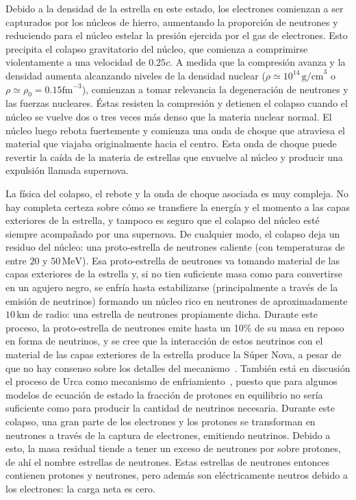 Debido a la densidad de la estrella en este estado, los electrones comienzan a ser capturados por los núcleos de hierro, aumentando la proporción de neutrones y reduciendo para el núcleo estelar la presión ejercida por el gas de electrones.
Esto precipita el colapso gravitatorio del núcleo, que comienza a comprimirse violentamente a una velocidad de $0.25c$.
A medida que la compresión avanza y la densidad aumenta alcanzando niveles de la densidad nuclear ($\rho \simeq 10^{14}\,\text{g/cm}^3$ o $ \rho \simeq \rho_0=0.15 \text{fm}^{-3}$), comienzan a tomar relevancia la degeneración de neutrones y las fuerzas nucleares.
Éstas resisten la compresión y detienen el colapso cuando el núcleo se vuelve dos o tres veces más denso que la materia nuclear normal.
El núcleo luego rebota fuertemente y comienza una onda de choque que atraviesa el material que viajaba originalmente hacia el centro.
Esta onda de choque puede revertir la caída de la materia de estrellas que envuelve al núcleo y producir una expulsión llamada supernova.

La física del colapso, el rebote y la onda de choque asociada es muy compleja.
No hay completa certeza sobre cómo se transfiere la energía y el momento a las capas exteriores de la estrella, y tampoco es seguro que el colapso del núcleo esté siempre acompañado por una supernova.
De cualquier modo, el colapso deja un residuo del núcleo: una proto-estrella de neutrones caliente (con temperaturas de entre $20$ y $50\,\text{MeV}$).
Esa proto-estrella de neutrones va tomando material de las capas exteriores de la estrella y, si no tien suficiente masa como para convertirse en un agujero negro, se enfría hasta estabilizarse (principalmente a través de la emisión de neutrinos) formando un núcleo rico en neutrones de aproximadamente $10\,\text{km}$ de radio: una estrella de neutrones propiamente dicha.
Durante este proceso, la proto-estrella de neutrones emite hasta un 10\% de su masa en reposo en forma de neutrinos, y se cree que la interacción de estos neutrinos con el material de las capas exteriores de la estrella produce la Súper Nova, a pesar de que no hay consenso sobre los detalles del mecanismo~\cite{woosley_physics_2005, bethe_supernova_1990}.
También está en discusión el proceso de Urca como mecanismo de enfriamiento~\cite{piekarewicz_proton_2012, lattimer_direct_1991}, puesto que para algunos modelos de ecuación de estado la fracción de protones en equilibrio no sería suficiente como para producir la cantidad de neutrinos necesaria.
Durante este colapso, una gran parte de los electrones y los protones se transforman en neutrones a través de la captura de electrones, emitiendo neutrinos.
Debido a esto, la masa residual tiende a tener un exceso de neutrones por sobre protones, de ahí el nombre estrellas de neutrones.
Estas estrellas de neutrones entonces contienen protones y neutrones, pero además son eléctricamente neutros debido a los electrones: la carga neta es cero.

